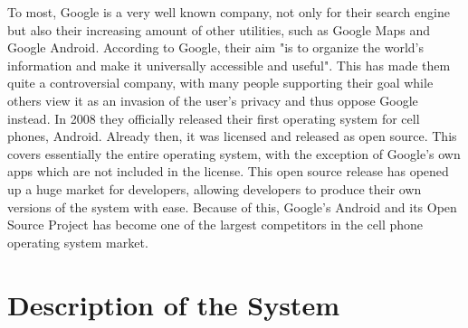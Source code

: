 \documentclass[conference]{IEEEtran}
\begin{document}

To most, Google\cite{android} is a very well known company, not only for their search engine but also their increasing amount of other utilities, such as Google Maps and Google Android. According to Google, their aim "is to organize the world’s information and make it universally accessible and useful".\cite{Goggin} This has made them quite a controversial company, with many people supporting their goal while others view it as an invasion of the user's privacy and thus oppose Google instead. 
In 2008 they officially released their first operating system for cell phones, Android.\cite{android-release} Already then, it was licensed and released as open source.\cite{android} This covers essentially the entire operating system, with the exception of Google's own apps which are not included in the license. This open source release has opened up a huge market for developers, allowing developers to produce their own versions of the system with ease. Because of this, Google's Android and its Open Source Project has become one of the largest competitors in the cell phone operating system market.\cite{android-market}


\section{Description of the System}
\label{system}
\end{document}
